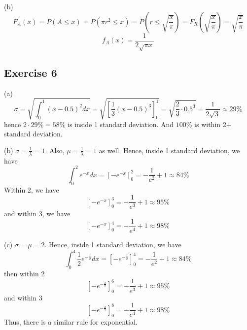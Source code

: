 \documentclass{book}
\begin{document}
\noindent
(b)
$$F_A(x) = P(A \leq x) = P(\pi r^2 \leq x) = P \left( r \leq \sqrt{\frac{x}{\pi}} \right) = F_R \left(\sqrt{\frac{x}{\pi}} \right) = \sqrt{\frac{x}{\pi}}$$
$$f_A(x) = \frac{1}{2\sqrt{\pi x}}$$

\subsection*{Exercise 6}
(a)
$$\sigma = \sqrt{\int_0^1 (x - 0.5)^2 dx} = \sqrt{\left[ \frac{1}{3}(x - 0.5)^3 \right]_0^1} = \sqrt{\frac{2}{3} \cdot 0.5^3} = \frac{1}{2\sqrt{3}} \approx 29\%$$
hence $2 \cdot 29\% = 58\%$ is inside 1 standard deviation. And $100\%$ is within 2+ standard deviation.

\noindent
(b)
$\sigma = \frac{1}{\lambda} = 1$. Also, $\mu = \frac{1}{\lambda} = 1$ as well. Hence, inside 1 standard deviation, we have
$$\int_0^2 e^{-x} dx = \left[ -e^{-x} \right]_0^2 = -\frac{1}{e^2} + 1 \approx 84\%$$
Within 2, we have
$$\left[ -e^{-x} \right]_0^3 = -\frac{1}{e^3} + 1 \approx 95\%$$
and within 3, we have
$$\left[ -e^{-x} \right]_0^4 = -\frac{1}{e^4} + 1 \approx 98\%$$

\noindent
(c)
$\sigma = \mu = 2$. Hence, inside 1 standard deviation, we have
$$\int_0^4 \frac{1}{2} e^{-\frac{x}{2}} dx = \left[ -e^{-\frac{x}{2}} \right]_0^4 = -\frac{1}{e^2} + 1 \approx 84\%$$
then within 2
$$\left[ -e^{-\frac{x}{2}} \right]_0^6 = -\frac{1}{e^3} + 1 \approx 95\%$$
and within 3
$$\left[ -e^{-\frac{x}{2}} \right]_0^8 = -\frac{1}{e^4} + 1 \approx 98\%$$
Thus, there is a similar rule for exponential.
\end{document}
